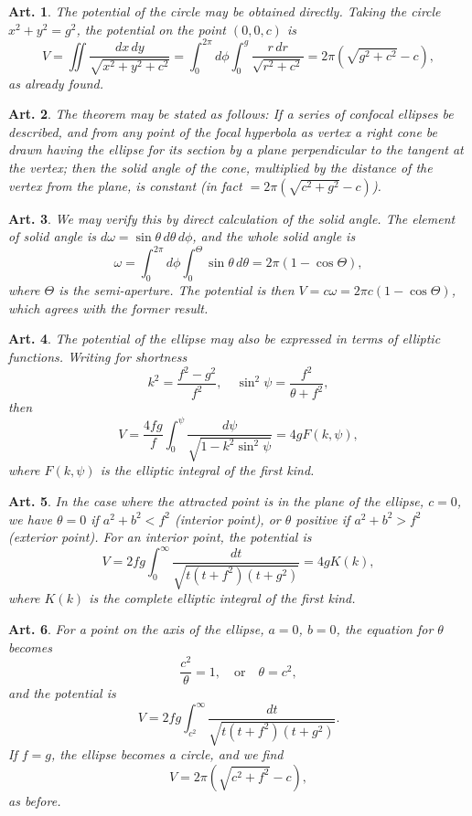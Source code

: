 \documentclass[12pt,a4paper]{article}
\theoremstyle{cayley}
\newtheorem{art}{Art.}[section]
\begin{document}
\begin{art}
The potential of the circle may be obtained directly. Taking the circle $x^2 + y^2 = g^2$, the potential on the point $(0, 0, c)$ is
\[
V = \iint \frac{dx\,dy}{\sqrt{x^2 + y^2 + c^2}}
= \int_0^{2\pi} d\phi \int_0^g \frac{r\,dr}{\sqrt{r^2 + c^2}}
= 2\pi(\sqrt{g^2 + c^2} - c),
\]
as already found.
\end{art}

\begin{art}
The theorem may be stated as follows: If a series of confocal ellipses be described, and from any point of the focal hyperbola as vertex a right cone be drawn having the ellipse for its section by a plane perpendicular to the tangent at the vertex; then the solid angle of the cone, multiplied by the distance of the vertex from the plane, is constant (in fact $= 2\pi(\sqrt{c^2+g^2} - c)$).
\end{art}

\begin{art}
We may verify this by direct calculation of the solid angle. The element of solid angle is $d\omega = \sin\theta\,d\theta\,d\phi$, and the whole solid angle is
\[
\omega = \int_0^{2\pi} d\phi \int_0^{\Theta} \sin\theta\,d\theta
= 2\pi(1 - \cos\Theta),
\]
where $\Theta$ is the semi-aperture. The potential is then $V = c\omega = 2\pi c(1 - \cos\Theta)$, which agrees with the former result.
\end{art}

\begin{art}
The potential of the ellipse may also be expressed in terms of elliptic functions. Writing for shortness
\[
k^2 = \frac{f^2 - g^2}{f^2},
\quad
\sin^2\psi = \frac{f^2}{\theta + f^2},
\]
then
\[
V = \frac{4fg}{f}\int_0^{\psi} \frac{d\psi}{\sqrt{1 - k^2\sin^2\psi}}
= 4gF(k, \psi),
\]
where $F(k, \psi)$ is the elliptic integral of the first kind.
\end{art}

\begin{art}
In the case where the attracted point is in the plane of the ellipse, $c=0$, we have $\theta = 0$ if $a^2 + b^2 < f^2$ (interior point), or $\theta$ positive if $a^2 + b^2 > f^2$ (exterior point). For an interior point, the potential is
\[
V = 2fg\int_0^{\infty} \frac{dt}{\sqrt{t(t+f^2)(t+g^2)}}
= 4gK(k),
\]
where $K(k)$ is the complete elliptic integral of the first kind.
\end{art}

\begin{art}
For a point on the axis of the ellipse, $a=0$, $b=0$, the equation for $\theta$ becomes
\[
\frac{c^2}{\theta} = 1,
\quad \text{or} \quad \theta = c^2,
\]
and the potential is
\[
V = 2fg\int_{c^2}^{\infty} \frac{dt}{\sqrt{t(t+f^2)(t+g^2)}}.
\]
If $f=g$, the ellipse becomes a circle, and we find
\[
V = 2\pi(\sqrt{c^2 + f^2} - c),
\]
as before.
\end{art}
\end{document}
